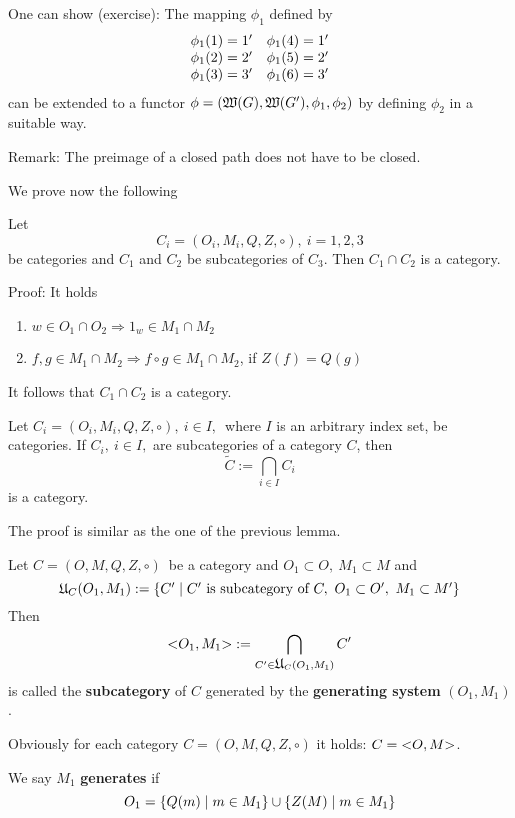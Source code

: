One can show (exercise): The mapping $\phi_1$ defined by 
\[\begin{array}{l@{\quad}l}
\phi_1(1) = 1' & \phi_1(4) = 1' \\
\phi_1(2) = 2' & \phi_1(5) = 2' \\
\phi_1(3) = 3' & \phi_1(6) = 3'
\end{array}\]
can be extended to a functor $\phi = (\mbox{$\mathfrak{W}(G)$}, \mbox{$\mathfrak{W}(G')$}, \phi_1,
\phi_2)$ by defining $\phi_2$ in a suitable way.

Remark: The preimage of a closed path does not have to be closed.

We prove now the following
\begin{lemma}
Let \[ C_i = (O_i, M_i, Q, Z, \circ),\ i = 1, 2, 3 \] be categories and $C_1$
and $C_2$ be subcategories of $C_3$. Then $C_1 \cap C_2$ is a category.
\end{lemma}

Proof: It holds
\begin{enumerate}
  \item $w \in O_1 \cap O_2 \Rightarrow 1_w \in M_1 \cap M_2$
  \item $f, g \in M_1 \cap M_2 \Rightarrow f \circ g \in M_1 \cap M_2$, if
  $Z(f) = Q(g)$
\end{enumerate}

It follows that $C_1 \cap C_2$ is a category.

\begin{lemma}
Let $ C_i = (O_i, M_i, Q, Z, \circ),\ i \in I,$\ where $I$ is an arbitrary
index set, be categories. If $C_i,\ i \in I,$ are subcategories of a category
$C$, then 
\[ \tilde{C} := \bigcap_{i \in I} C_i \] 
is a category.
\end{lemma}

The proof is similar as the one of the previous lemma.

\begin{definition}
Let $C = (O, M, Q, Z, \circ)$\ be a category and $O_1 \subset O,\ M_1 \subset M$
and 
\[ \mbox{$\mathfrak{U}$}_C(O_1, M_1) := \mbox{$\{C' \mid C'\text{ is subcategory of }C,\
O_1 \subset O',\ M_1 \subset M'\}$} \]
Then 
\[ \mbox{${<}O_1,M_1{>}$} := \bigcap_{C' \in \mbox{$\mathfrak{U}$}_C(O_1, M_1)} C' \]
is called the {\bf subcategory} of $C$ generated by the {\bf generating system}
$(O_1, M_1)$.
\end{definition}

Obviously for each category $C = (O, M, Q, Z, \circ)$ it holds: $C =
\mbox{${<}O,M{>}$}$.

We say $M_1$ {\bf generates}  if 
\[ O_1 = \mbox{$\{Q(m) \mid m \in M_1\}$} \cup \mbox{$\{Z(M) \mid m \in M_1\}$} \]

